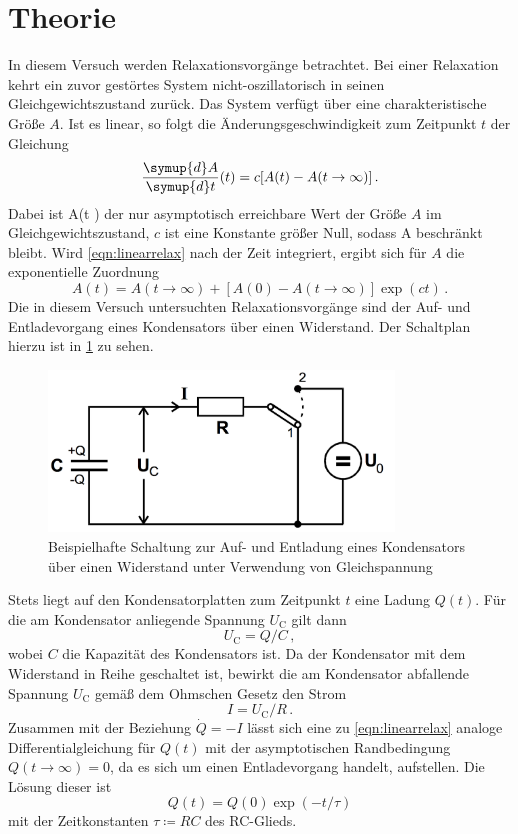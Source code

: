 \section{Theorie}
In diesem Versuch werden Relaxationsvorgänge betrachtet. Bei einer Relaxation kehrt
ein zuvor gestörtes System nicht-oszillatorisch in seinen Gleichgewichtszustand
zurück. Das System verfügt über eine charakteristische Größe $A$. Ist es linear,
so folgt die Änderungsgeschwindigkeit zum Zeitpunkt $t$ der Gleichung
\begin{equation}
  \frac{\symup{d}A}{\symup{d}t}(t) = c[A(t)-A(t \to \infty)]\,.
  \label{eqn:linearrelax}
\end{equation}
Dabei ist A(t \to \infty) der nur asymptotisch erreichbare Wert der Größe $A$ im
Gleichgewichtszustand, $c$ ist eine Konstante größer Null, sodass A beschränkt
bleibt.
Wird \eqref{eqn:linearrelax} nach der Zeit integriert, ergibt sich für $A$ die
exponentielle Zuordnung
\begin{equation}
  A(t) = A(t \to \infty) + [A(0) - A(t \to \infty)] \exp(ct)\,.
\end{equation}
Die in diesem Versuch untersuchten Relaxationsvorgänge sind der Auf- und Entladevorgang
eines Kondensators über einen Widerstand. Der Schaltplan hierzu ist in \ref{fig:Aufbau_1} zu sehen.
\begin{figure}
  \centering
  \includegraphics[width=260pt]{aufbau_1.png}
  \caption{Beispielhafte Schaltung zur Auf- und Entladung eines Kondensators über einen
  Widerstand unter Verwendung von Gleichspannung \cite{Versuchsanleitung}}
  \label{fig:Aufbau_1}
\end{figure}


Stets liegt auf den Kondensatorplatten zum Zeitpunkt $t$ eine Ladung $Q(t)$. Für
die am Kondensator anliegende Spannung $U_{\text{C}}$ gilt dann
\begin{equation}
  U_{\text{C}} = Q / C\,,
\end{equation}
wobei $C$ die Kapazität des Kondensators ist. Da der Kondensator mit dem Widerstand
in Reihe geschaltet ist, bewirkt die am Kondensator abfallende Spannung $U_{\text{C}}$
gemäß dem Ohmschen Gesetz den Strom
\begin{equation}
  I = U_{\text{C}} / R\,.
\end{equation}
Zusammen mit der Beziehung $\dot{Q} = -I$ lässt sich eine zu \eqref{eqn:linearrelax}
analoge Differentialgleichung für $Q(t)$ mit der asymptotischen Randbedingung
$Q(t \to \infty) = 0$, da es sich um einen Entladevorgang handelt, aufstellen. Die
Lösung dieser ist
\begin{equation}
  Q(t) = Q(0) \exp(-t/\tau)
\end{equation}
mit der Zeitkonstanten $\tau \coloneqq RC$ des RC-Glieds.


